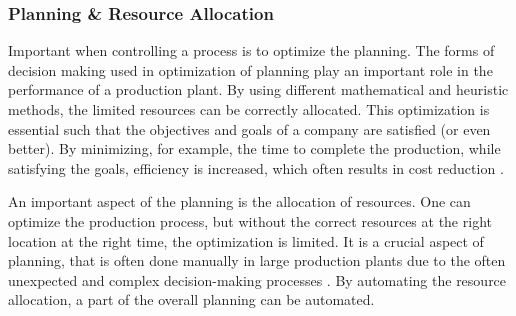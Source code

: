 \subsubsection{Planning \& Resource Allocation}
Important when controlling a process is to optimize the planning. The forms of decision making used in optimization of planning play an important role in the performance of a production plant. By using different mathematical and heuristic methods, the limited resources can be correctly allocated. This optimization is essential such that the objectives and goals of a company are satisfied (or even better). By minimizing, for example, the time to complete the production, while satisfying the goals, efficiency is increased, which often results in cost reduction \citep{pinedo2005planning}. 

An important aspect of the planning is the allocation of resources. One can optimize the production process, but without the correct resources at the right location at the right time, the optimization is limited. It is a crucial aspect of planning, that is often done manually in large production plants due to the often unexpected and complex decision-making processes \citep{pinedo2005planning}. By automating the resource allocation, a part of the overall planning can be automated.

